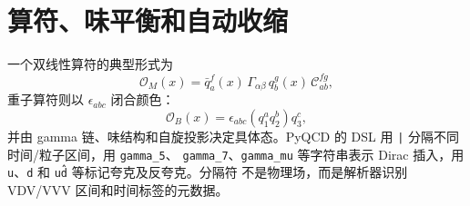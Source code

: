 \documentclass[UTF8,11pt,oneside]{ctexbook}
\begin{document}
\section{算符、味平衡和自动收缩}
一个双线性算符的典型形式为
\begin{equation}
 \mathcal O_M(x)=\bar q_a^f(x)\,\Gamma_{\alpha\beta}\,
 q_b^g(x)\,\mathcal C_{ab}^{fg},
\end{equation}
重子算符则以 \(\epsilon_{abc}\) 闭合颜色：
\begin{equation}
 \mathcal O_B(x)=\epsilon_{abc}(q_1^a q_2^b)q_3^c,
\end{equation}
并由 gamma 链、味结构和自旋投影决定具体态。PyQCD 的 DSL 用
\texttt{|} 分隔不同时间/粒子区间，用 \texttt{gamma\_5}、
\texttt{gamma\_7}、\texttt{gamma\_mu} 等字符串表示 Dirac 插入，用
\texttt{u}、\texttt{d} 和 \texttt{u\^d} 等标记夸克及反夸克。分隔符
不是物理场，而是解析器识别 VDV/VVV 区间和时间标签的元数据。
\end{document}
